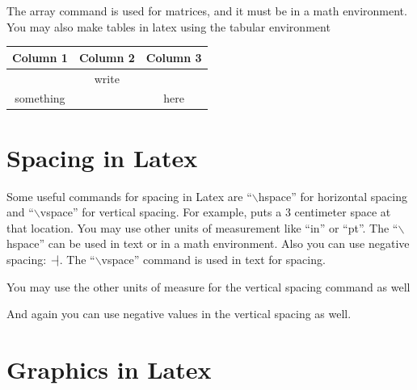 \documentclass[11pt]{article}
\begin{document}
The array command is used for matrices, and it must be in a math environment.  You may also make tables in latex using the tabular environment

\begin{center} %
\begin{tabular}{|c|cc|} %
\hline %
Column 1  & Column 2 & Column 3\\
\hline
          & write    &\\
something &          &here\\ 
\hline %
\end{tabular}
\end{center}

\section{Spacing in Latex}

Some useful commands for spacing in Latex are ``$\backslash$hspace'' for horizontal spacing and ``$\backslash$vspace'' for vertical spacing.  For example, \hspace{3cm} puts a 3 centimeter space at that location.  You may use other units of measurement like ``in'' or ``pt''.  The ``$\backslash$hspace'' can be used in text or in a math environment.  Also you can use negative spacing: $-\hspace{-3pt}|$.  The ``$\backslash$vspace'' command is used in text for spacing.\\

\vspace{20pt}

You may use the other units of measure for the vertical spacing command as well\\

\vspace{-.75cm}

And again you can use negative values in the vertical spacing as well.

\section{Graphics in Latex}
\end{document}
